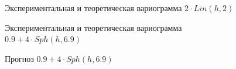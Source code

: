 \begin{figure}[ht]
\caption{Экспериментальная и теоретическая вариограмма $ 2 \cdot Lin(h, 2) $}
\label{img:lin-adapt-modeled}
\end{figure}

\begin{figure}[H]
\caption{Экспериментальная и теоретическая вариограмма $ 0.9 + 4 \cdot Sph(h, 6.9) $}
\label{img:sph-adapt-modeled}
\end{figure}

\begin{figure}[H]
\caption{Прогноз $ 0.9 + 4 \cdot Sph(h, 6.9) $}
\label{img:sph-adapt-pred}
\end{figure}

